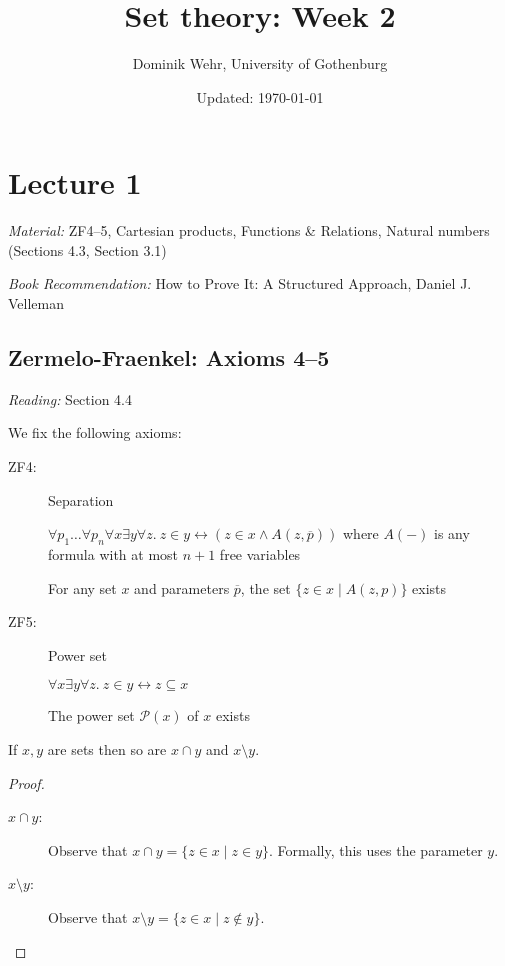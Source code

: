 \documentclass{whrartcl}
\title{Set theory: Week 2}
\author{Dominik Wehr, University of Gothenburg}
\date{Updated: \today}
\newcommand{\pow}{\mathcal{P}}
\newcommand{\ol}[1]{\overline{#1}}
\begin{document}
\maketitle


\section{Lecture 1}

\emph{Material:}  ZF4--5, Cartesian products, Functions \& Relations, Natural
numbers (Sections 4.3, Section 3.1)

\emph{Book Recommendation:} How to Prove It: A Structured Approach, Daniel J. Velleman


\subsection{Zermelo-Fraenkel: Axioms 4--5}

\emph{Reading:} Section 4.4

\begin{definition}
  We fix the following axioms:
  \begin{description}
  \item[ZF4:] Separation

    $\forall p_1 \ldots \forall p_n \forall x \exists y \forall z.~z \in y \leftrightarrow (z \in x \wedge
    A(z, \ol{p}))$ where $A(-)$ is any formula with at most $n + 1$ free variables

    For any set $x$ and parameters $\ol{p}$, the set $\{z \in x \mid A(z, p)\}$ exists

  \item[ZF5:] Power set

    $\forall x \exists y \forall z.~z \in y \leftrightarrow z \subseteq x$

    The power set $\pow(x)$ of $x$ exists
  \end{description}
\end{definition}

\begin{proposition}
  If $x, y$ are sets then so are $x \cap y$ and $x \setminus y$.
\end{proposition}
\begin{proof}
  \
  \begin{description}
  \item[$x \cap y$:] Observe that $x \cap y = \{z \in x \mid z \in y\}$.
    Formally, this uses the parameter $y$.
  \item[$x \setminus y$:] Observe that $x \setminus y = \{z \in x \mid z \not\in
    y\}$.
  \end{description}
\end{proof}
\end{document}
